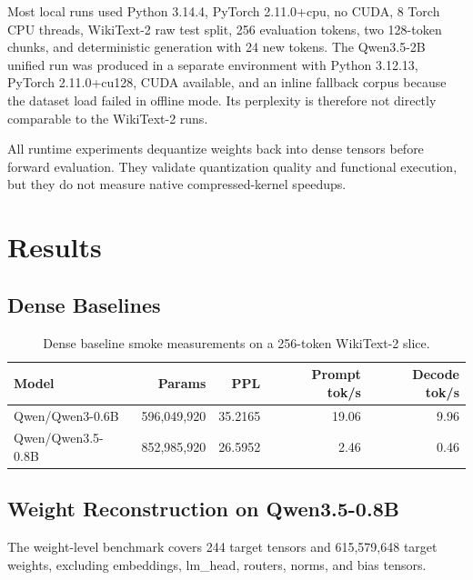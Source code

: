 \documentclass[11pt]{article}
\begin{document}
Most local runs used Python 3.14.4, PyTorch 2.11.0+cpu, no CUDA, 8 Torch CPU threads, WikiText-2 raw test split, 256 evaluation tokens, two 128-token chunks, and deterministic generation with 24 new tokens. The Qwen3.5-2B unified run was produced in a separate environment with Python 3.12.13, PyTorch 2.11.0+cu128, CUDA available, and an inline fallback corpus because the dataset load failed in offline mode. Its perplexity is therefore not directly comparable to the WikiText-2 runs.

All runtime experiments dequantize weights back into dense tensors before forward evaluation. They validate quantization quality and functional execution, but they do not measure native compressed-kernel speedups.

\section{Results}

\subsection{Dense Baselines}

\begin{table}[h]
\centering
\begin{tabular}{lrrrr}
\toprule
Model & Params & PPL & Prompt tok/s & Decode tok/s \\
\midrule
Qwen/Qwen3-0.6B & 596,049,920 & 35.2165 & 19.06 & 9.96 \\
Qwen/Qwen3.5-0.8B & 852,985,920 & 26.5952 & 2.46 & 0.46 \\
\bottomrule
\end{tabular}
\caption{Dense baseline smoke measurements on a 256-token WikiText-2 slice.}
\label{tab:dense}
\end{table}

\subsection{Weight Reconstruction on Qwen3.5-0.8B}

The weight-level benchmark covers 244 target tensors and 615,579,648 target weights, excluding embeddings, lm\_head, routers, norms, and bias tensors.
\end{document}
